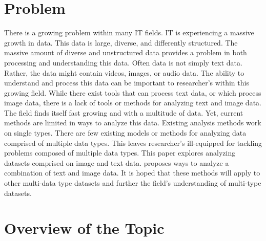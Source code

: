 
\section{Problem}
There is a growing problem within many IT fields.  IT is experiencing a massive growth in data.  This data is large, diverse, and differently structured.  The massive amount of diverse and unstructured data provides a problem in both processing and understanding this data.  Often data is not simply text data.  Rather, the data might contain videos, images, or audio data.  The ability to understand and process this data can be important to researcher's within this growing field.  While there exist tools that can process text data, or which process image data, there is a lack of tools or methods for analyzing text and image data.  The field finds itself fast growing and with a multitude of data.  Yet, current methods are limited in ways to analyze this data.  Existing analysis methods work on single types.  There are few existing models or methods for analyzing data comprised of multiple data types.  This leaves researcher's ill-equipped for tackling problems composed of multiple data types.  This paper explores analyzing datasets comprised on image and text data.  proposes ways to analyze a combination of text and image data.  It is hoped that these methods will apply to other multi-data type datasets and further the field's understanding of multi-type datasets.  

\section{Overview of the Topic}

